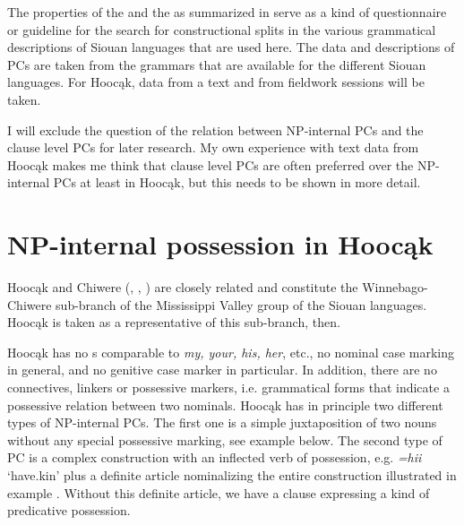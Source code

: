 \documentclass[output=paper]{LSP/langsci}
\begin{document}
 
The properties of the  and the  as summarized in  serve as a kind of questionnaire or guideline for the search for constructional splits in the various grammatical descriptions of Siouan languages that are used here. The data and descriptions of PCs are taken from the grammars that are available for the different Siouan languages. For Hoocąk, data from a text  and from fieldwork sessions will be taken. 
 

I will exclude the question of the relation between NP-internal PCs and the clause level PCs for later research. My own experience with text data from Hoocąk makes me think that clause level PCs are often preferred over the NP-internal PCs at least in Hoocąk, but this needs to be shown in more detail. 

\section{NP-internal possession in Hoocąk}

 
Hoocąk and Chiwere (, , ) are closely related and constitute the Winnebago-Chiwere sub-branch of the Mississippi Valley group of the Siouan languages. Hoocąk is taken as a representative of this sub-branch, then. 

Hoocąk has no s comparable to  \textit{my, your, his, her}, etc., no nominal case marking in general, and no genitive case marker in particular. In addition, there are no connectives, linkers or possessive markers, i.e. grammatical forms that indicate a possessive relation between two nominals. Hoocąk has in principle two different types of NP-internal PCs. The first one is a simple juxtaposition of two nouns without any special possessive marking, see example  below. The second type of PC is a complex construction with an inflected verb of possession, e.g. \textit{=hii} `have.kin' plus a definite article nominalizing the entire construction illustrated in example . Without this definite article, we have a clause expressing a kind of predicative possession. 

\ea  \label{petersdog}
 {}{\citealt[16]{Helmbrecht2003}} \\
 
\end{document}
